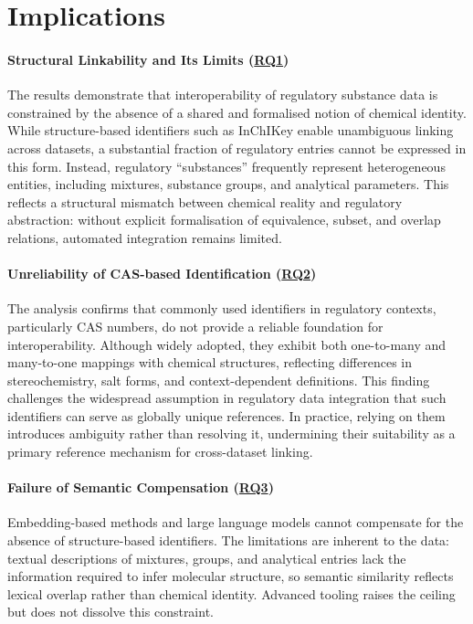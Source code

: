 \section{Implications}
\label{sec:discussion}

\paragraph{Structural Linkability and Its Limits (\texorpdfstring{\hyperref[sec:question1]{RQ1}}{RQ1})}

The results demonstrate that interoperability of regulatory substance data is constrained by the absence of a shared and formalised notion of chemical identity. While structure-based identifiers such as InChIKey enable unambiguous linking across datasets, a substantial fraction of regulatory entries cannot be expressed in this form. Instead, regulatory “substances” frequently represent heterogeneous entities, including mixtures, substance groups, and analytical parameters. This reflects a structural mismatch between chemical reality and regulatory abstraction: without explicit formalisation of equivalence, subset, and overlap relations, automated integration remains limited.

\paragraph{Unreliability of CAS-based Identification (\texorpdfstring{\hyperref[sec:question2]{RQ2}}{RQ2})}

The analysis confirms that commonly used identifiers in regulatory contexts, particularly CAS numbers, do not provide a reliable foundation for interoperability. Although widely adopted, they exhibit both one-to-many and many-to-one mappings with chemical structures, reflecting differences in stereochemistry, salt forms, and context-dependent definitions. This finding challenges the widespread assumption in regulatory data integration that such identifiers can serve as globally unique references. In practice, relying on them introduces ambiguity rather than resolving it, undermining their suitability as a primary reference mechanism for cross-dataset linking.

\paragraph{Failure of Semantic Compensation (\texorpdfstring{\hyperref[sec:question3]{RQ3}}{RQ3})}

Embedding-based methods and large language models cannot compensate for the absence of structure-based identifiers. The limitations are inherent to the data: textual descriptions of mixtures, groups, and analytical entries lack the information required to infer molecular structure, so semantic similarity reflects lexical overlap rather than chemical identity. Advanced tooling raises the ceiling but does not dissolve this constraint.

